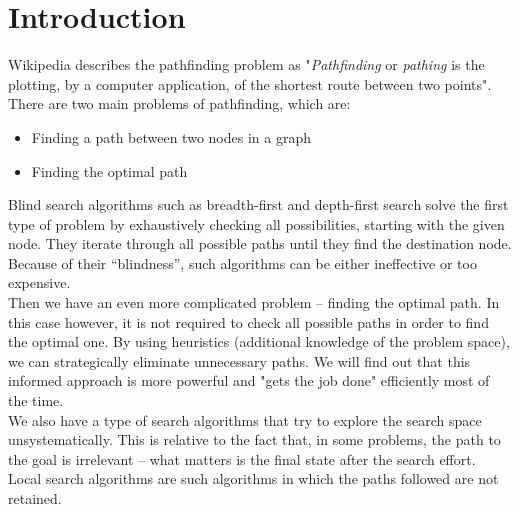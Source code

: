 \documentclass[a4paper]{article}
\begin{document}
\section{Introduction}

Wikipedia describes the pathfinding problem as "\emph{Pathfinding} or \emph{pathing} is the plotting, by a computer application, of the shortest route between two points". There are two main problems of pathfinding, which are:

\begin{itemize}
	\item Finding a path between two nodes in a graph 
	\item Finding the optimal path
\end{itemize}

\noindent Blind search algorithms such as breadth-first and depth-first search solve the first type of problem by exhaustively checking all possibilities, starting with the given node. They iterate through all possible paths until they find the destination node. Because of their “blindness”, such algorithms can be either ineffective or too expensive. \\

\noindent Then we have an even more complicated problem – finding the optimal path. In this case however, it is not required to check all possible paths in order to find the optimal one. By using heuristics (additional knowledge of the problem space), we can strategically eliminate unnecessary paths. We will find out that this informed approach is more powerful and "gets the job done" efficiently most of the time. \\

\noindent We also have a type of search algorithms that try to explore the search space unsystematically. This is relative to the fact that, in some problems, the path to the goal is irrelevant – what matters is the final state after the search effort. Local search algorithms are such algorithms in which the paths followed are not retained. \\
 
\end{document}
